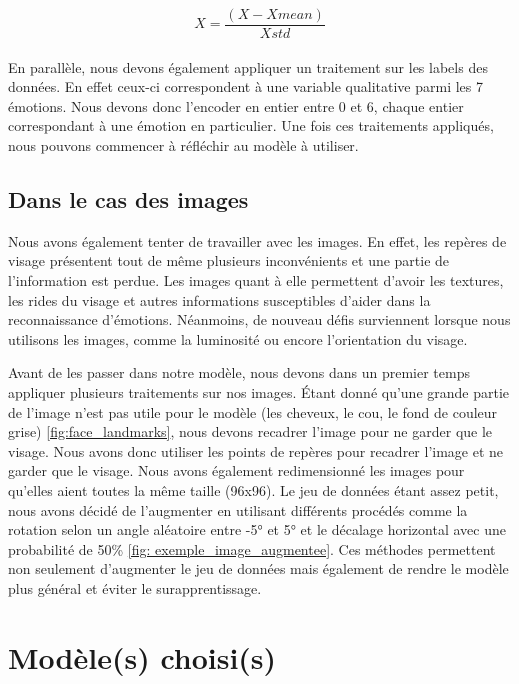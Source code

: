 \documentclass{rapport}
\begin{document}
\begin{equation}
    X = \frac{(X - Xmean)} {Xstd}
\end{equation}\\

En parallèle, nous devons également appliquer un traitement sur les labels des données.
En effet ceux-ci correspondent à une variable qualitative parmi les 7 émotions.
Nous devons donc l'encoder en entier entre 0 et 6, chaque entier correspondant à une émotion en particulier.
Une fois ces traitements appliqués, nous pouvons commencer à réfléchir au modèle à utiliser.\\

\subsection{Dans le cas des images}
Nous avons également tenter de travailler avec les images.
En effet, les repères de visage présentent tout de même plusieurs inconvénients et une partie de l'information est perdue.
Les images quant à elle permettent d'avoir les textures,
les rides du visage et autres informations susceptibles d'aider dans la reconnaissance d'émotions.
Néanmoins, de nouveau défis surviennent lorsque nous utilisons les images, comme la luminosité ou encore l'orientation du visage.

Avant de les passer dans notre modèle, nous devons dans un premier temps appliquer plusieurs
traitements sur nos images. Étant donné qu'une grande partie de l'image n'est pas utile pour le modèle
(les cheveux, le cou, le fond de couleur grise) \ref*{fig:face_landmarks}, nous devons recadrer l'image
pour ne garder que le visage. Nous avons donc utiliser les points de repères pour recadrer l'image et
ne garder que le visage. Nous avons également redimensionné les images pour qu'elles aient toutes la même taille (96x96).
Le jeu de données étant assez petit, nous avons décidé de l'augmenter en utilisant différents procédés comme la
rotation selon un angle aléatoire entre -5° et 5° et le décalage horizontal avec une probabilité de 50\% \ref*{fig: exemple_image_augmentee}.
Ces méthodes permettent non seulement d'augmenter le jeu de données mais également de rendre le modèle plus général
et éviter le surapprentissage.


\section{Modèle(s) choisi(s)}
\end{document}
